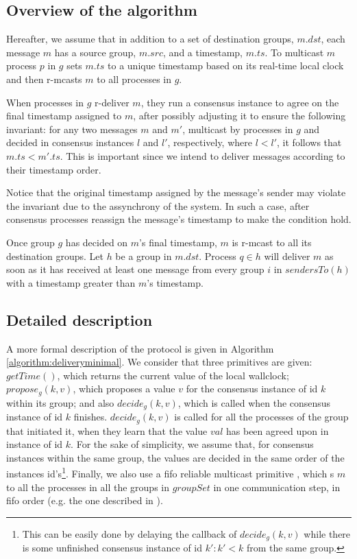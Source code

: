\documentclass[times, 10pt]{article}
\begin{document}
\subsection{Overview of the algorithm}

Hereafter, we assume that in addition to a set of destination groups, $m.dst$, each message $m$ has a source group, $m.src$, and a timestamp, $m.ts$. To multicast $m$ process $p$ in $g$ sets $m.ts$ to a unique timestamp based on its real-time local clock and then r-mcasts $m$ to all processes in $g$.

When processes in $g$ r-deliver $m$, they run a consensus instance to agree on the final timestamp assigned to $m$, after possibly adjusting it to ensure the following invariant: for any two messages $m$ and $m'$, multicast by processes in $g$ and decided in consensus instances $l$ and $l'$, respectively, where $l < l'$, it follows that $m.ts < m'.ts$. This is important since we intend to deliver messages according to their timestamp order.

Notice that the original timestamp assigned by the message's sender may violate the invariant due to the assynchrony of the system. In such a case, after consensus processes reassign the message's timestamp to make the condition hold.

Once group $g$ has decided on $m$'s final timestamp, $m$ is r-mcast to all its destination groups. Let $h$ be a group in $m.dst$. Process $q \in h$ will deliver $m$ as soon as it has received at least one message from every group $i$ in $sendersTo(h)$ with a timestamp greater than $m$'s timestamp.


\subsection{Detailed description}

A more formal description of the protocol is given in Algorithm \ref{algorithm:deliveryminimal}. We consider that three primitives are given: $getTime()$, which returns the current value of the local wallclock; $propose_g(k, v)$, which proposes a value $v$ for the consensus instance of id $k$ within its group; and also $decide_g(k, v)$, which is called when the consensus instance of id $k$ finishes. $decide_g(k, v)$ is called for all the processes of the group that initiated it, when they learn that the value $val$ has been agreed upon in instance of id $k$. For the sake of simplicity, we assume that, for consensus instances within the same group, the values are decided in the same order of the instances id's\footnote{This can be easily done by delaying the callback of $decide_g(k, v)$ while there is some unfinished consensus instance of id $k': k' < k$ from the same group.}. Finally, we also use a fifo reliable multicast primitive , which \rmdel{}s $m$ to all the processes in all the groups in $groupSet$ in one communication step, in fifo order (e.g. the one described in \cite{ufrmcast1delta}).
\end{document}
